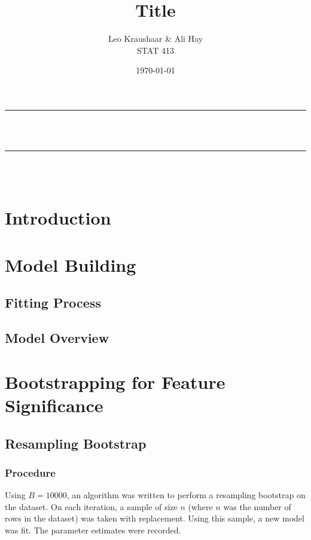 \documentclass[12pt]{article}
\title{Title}
\author{Leo Kraushaar \& Ali Hay \\ STAT 413}
\date{\today}
\begin{document}
\onehalfspacing

\begin{titlepage}
    \newcommand{\HRule}{\rule{\linewidth}{0.5mm}}
    \center
    
    \HRule \\[1cm]
    { \huge \bfseries \thetitle}\\[0.4cm] 
    \HRule \\[1.8cm]
    
    \Large \thedate\\[5cm]
    
    \begin{minipage}{1\textwidth}
    \vspace{10cm}
    \begin{flushleft} \large
    \theauthor
    \end{flushleft}

    \end{minipage}
\end{titlepage}

\newpage
\section{Introduction}

\newpage
\section{Model Building}
\subsection{Fitting Process}
\subsection{Model Overview}

\newpage
\section{Bootstrapping for Feature Significance}
\subsection{Resampling Bootstrap}
\subsubsection*{Procedure}
Using $B = 10000$, an algorithm was written to perform a resampling bootstrap on the dataset. On each iteration, a sample of size $n$ (where $n$ was the number of rows in the dataset) was taken with replacement. Using this sample, a new model was fit. The parameter estimates were recorded.
\end{document}
